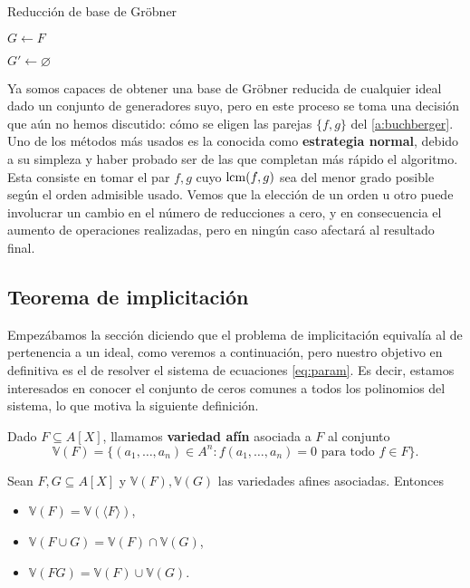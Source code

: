 \begin{algorithm}[hbt!]
    \caption{Reducción de base de Gröbner}\label{a:minim}
    $G\gets F$\;

    $G' \gets \varnothing$\;

\end{algorithm}

Ya somos capaces de obtener una base de Gröbner reducida de cualquier ideal dado un conjunto de generadores suyo, pero en este proceso se toma una decisión que aún no hemos discutido: cómo se eligen las parejas $\{f,g\}$ del \autoref{a:buchberger}. Uno de los métodos más usados es la conocida como \textbf{estrategia normal}, debido a su simpleza y haber probado ser de las que completan más rápido el algoritmo. Esta consiste en tomar el par $f,g$ cuyo $\operatorname{lcm}(f,g)$ sea del menor grado posible según el orden admisible usado. Vemos que la elección de un orden u otro puede involucrar un cambio en el número de reducciones a cero, y en consecuencia el aumento de operaciones realizadas, pero en ningún caso afectará al resultado final.

\subsection{Teorema de implicitación}
Empezábamos la sección diciendo que el problema de implicitación equivalía al de pertenencia a un ideal, como veremos a continuación, pero nuestro objetivo en definitiva es el de resolver el sistema de ecuaciones \eqref{eq:param}. Es decir, estamos interesados en conocer el conjunto de ceros comunes a todos los polinomios del sistema, lo que motiva la siguiente definición.
\begin{definicion}Dado $F \subseteq A[X]$, llamamos \textbf{variedad afín} asociada a $F$ al conjunto
    \begin{equation*}
        \mathbb{V}(F) = \{(a_1,\dots, a_n)\in A^n : f(a_1,\dots, a_n)=0 \text{ para todo } f\in F \}.
    \end{equation*}
\end{definicion}

\begin{proposicion}
    Sean $F,G\subseteq A[X]$ y $\mathbb{V}(F), \mathbb{V}(G)$ las variedades afines asociadas. Entonces
    \begin{itemize}
        \item  $\mathbb{V}(F) =  \mathbb{V}(\langle F\rangle)$,
        \item $\mathbb{V}(F\cup G) = \mathbb{V}(F) \cap \mathbb{V}(G)$,
        \item $\mathbb{V}(FG) = \mathbb{V}(F) \cup \mathbb{V}(G)$.
    \end{itemize}
\end{proposicion}

